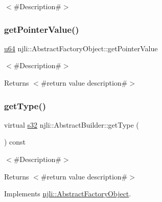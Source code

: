 $<$\#\+Description\#$>$ \mbox{\label{classnjli_1_1_abstract_builder_a4ffddf141a426a5a07d0ac19f1913811}} 
\subsubsection{\texorpdfstring{get\+Pointer\+Value()}{getPointerValue()}}
{\footnotesize\ttfamily \mbox{\hyperlink{_util_8h_ad758b7a5c3f18ed79d2fcd23d9f16357}{u64}} njli\+::\+Abstract\+Factory\+Object\+::get\+Pointer\+Value}

$<$\#\+Description\#$>$

\begin{DoxyReturn}{Returns}
$<$\#return value description\#$>$ 
\end{DoxyReturn}
\mbox{\label{classnjli_1_1_abstract_builder_abb4a8161cd71be12807fe85864b67050}} 
\subsubsection{\texorpdfstring{get\+Type()}{getType()}}
{\footnotesize\ttfamily virtual \mbox{\hyperlink{_util_8h_aa62c75d314a0d1f37f79c4b73b2292e2}{s32}} njli\+::\+Abstract\+Builder\+::get\+Type (\begin{DoxyParamCaption}{ }\end{DoxyParamCaption}) const\hspace{0.3cm}{\ttfamily [pure virtual]}}

$<$\#\+Description\#$>$

\begin{DoxyReturn}{Returns}
$<$\#return value description\#$>$ 
\end{DoxyReturn}


Implements \mbox{\hyperlink{classnjli_1_1_abstract_factory_object_a207c86146d40d0794708ae7f2d4e60a7}{njli\+::\+Abstract\+Factory\+Object}}.




